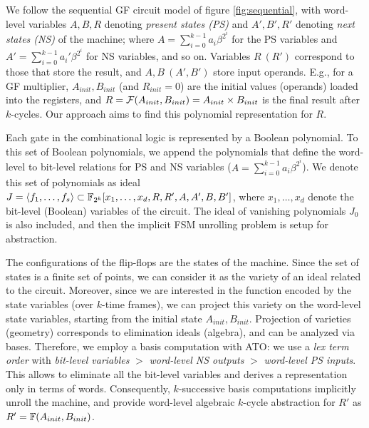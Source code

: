We follow  the sequential GF circuit model of
figure \ref{fig:sequential}, with word-level variables $A, B, R$
denoting {\it present states (PS)} and $A', B', R'$ denoting {\it next
  states (NS)} of the machine; where $A = \sum_{i=0}^{k-1} a_i \beta^{2^i}$
for the PS variables and $A' = \sum_{i=0}^{k-1} a_i'
\beta^{2^i}$ for NS variables, and so on.  Variables $R\ (R')$ correspond to those that 
store the result, and $A, B\ (A', B')$ store input operands. E.g.,
for a GF multiplier, $A_{init}, B_{init}$ (and $R_{init} =
0$) are the initial values (operands) loaded into the registers,  and
$R = {\mathcal{F}}(A_{init}, B_{init}) = A_{init} \times B_{init}$ is the final
result after $k$-cycles. Our approach aims to find this polynomial
representation for $R$.  

Each gate in the combinational logic is represented by a Boolean
polynomial. To 
this set of Boolean polynomials, we append the polynomials that define
the word-level to bit-level relations for PS and NS variables ($A =
\sum_{i=0}^{k-1} a_i \beta^{2^i}$). We denote this set of polynomials
as ideal $J = \langle 
f_1, \dots, f_s \rangle \subset {\mathbb{F}}_{2^k}[x_1, \dots, x_d, R, R', A, A', B,
  B']$, where $x_1, \dots, x_d$ denote the bit-level (Boolean) variables
  of the circuit. The ideal of vanishing polynomials $J_0$ is also included, and
then the implicit FSM unrolling problem is setup for abstraction. 

The configurations of the flip-flops are the states of the
machine. Since the set of states is a finite set of points, we
can consider it as the variety of an ideal related to the circuit.
Moreover, since we are interested in
the function encoded by the state variables (over $k$-time
frames), we can project this variety on the word-level state
variables, starting from the initial state $A_{init}, B_{init}$.
Projection of varieties (geometry) corresponds to elimination ideals
(algebra), and can be analyzed via \Grobner bases. Therefore, we
employ a \Grobner basis computation with ATO: we use a {\it lex term
  order} with {\it bit-level variables} 
$>$ {\it word-level NS outputs} $>$ {\it word-level PS inputs}. This
allows to eliminate all the bit-level variables 
and derives a representation only in terms of words. 
Consequently, $k$-successive \Grobner basis computations implicitly
unroll the machine, and provide word-level algebraic $k$-cycle
abstraction for $R'$ as $R' = {\mathbb{F}}(A_{init}, B_{init})$. 

